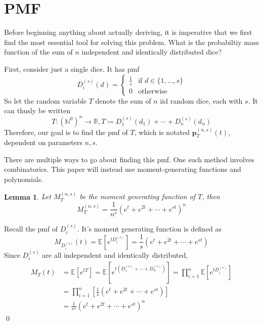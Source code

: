 \documentclass[a4paper]{article}
\newtheorem{lemma}{Lemma}
\renewenvironment{proof}{{\bfseries Proof}}{\qed}
\begin{document}
\section{PMF}

Before beginning anything about actually deriving, it is imperative that we first find the most essential tool for solving this problem. What is the probabiltiy mass function of the sum of $n$ independent and identically distributed dice? 


First, consider just a single dice. It has pmf
%
$$
D_{i}^{(s)}(d) = \begin{cases}
    \frac{1}{s} & \text{if } d \in \{1, \ldots, s \} \\
    0 & \text{otherwise}
\end{cases}
$$
%
So let the random variable $T$ denote the sum of $n$ iid random dice, each with $s$. It can thusly be written
%
$$ 
T: \left(\mathbb{N}^{0}\right)^n \to \mathbb{R}, T \coloneqq D_{1}^{(s)}(d_1) + \cdots + D_{n}^{(s)}(d_n) 
$$
%
Therefore, our goal is to find the pmf of $T$, which is notated $\textbf{p}_{T}^{(n, s)}(t)$, dependent on parameters $n, s$. 

There are multiple ways to go about finding this pmf. One such method involves combinatorics. This paper will instead use moment-generating functions and polynomials.


\begin{lemma}
    Let $M_{T}^{(n, s)}$ be the moment generating function of $T$, then 
    $$ M_{T}^{(n, s)} = \frac{1}{n^s} (e^{t} + e^{2t} + \cdots  + e^{st})^n $$
\end{lemma}


\begin{proof}
    Recall the pmf of $D_{i}^{(s)}$. It's moment generating function is defined as
    $$
    M_{D_{i}^{(s)}}(t) = \mathbb{E}[e^{tD_{i}^{(s)}}] = \frac{1}{s}(e^{t} + e^{2t} + \cdots + e^{st})
    $$
    Since $D_{i}^{(s)}$ are all independent and identically distributed,
    \begin{align*}
        M_{T}(t) &= \mathbb{E}[e^{tT}] = \mathbb{E}[e^{t(D_{1}^{(s)} + \cdots + D_{n}^{(s)})}] = \prod_{i = 1}^{n} \mathbb{E}[e^{tD_{i}^{(s)}}] \\
        &= \prod_{i = 1}^{n} \left[\frac{1}{s}(e^{t} + e^{2t} + \cdots + e^{st}) \right] \\
        &= \frac{1}{s^n} (e^{t} + e^{2t} + \cdots + e^{st})^n
    \end{align*}
\end{proof}
\end{document}
